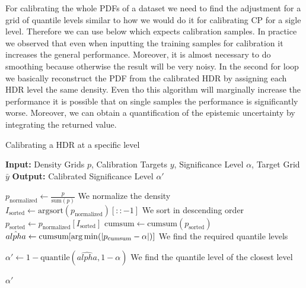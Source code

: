 For calibrating the whole PDFs of a dataset we need to find the adjustment for a grid of quantile levels similar to how we would do it for calibrating CP for a sigle level. Therefore we can use  below which expects calibration samples. In practice we observed that even when inputting the training samples for calibration it increases the general performance. Moreover, it is almost necessary to do smoothing because otherwise the result will be very noisy. In the second for loop we basically reconstruct the PDF from the calibrated HDR by assigning each HDR level the same density. Even tho this algorithm will marginally increase the performance it is possible that on single samples the performance is significantly worse. Moreover, we can obtain a quantification of the epistemic uncertainty by integrating the returned value.

\begin{algorithm}
    \caption{Calibrating a HDR at a specific level}
    \label{alg:calibrate_hdr}
    \begin{algorithmic}
        \STATE \textbf{Input:} Density Grids $p$, Calibration Targets $y$, Significance Level $\alpha$, Target Grid $\bar{y}$
        \STATE \textbf{Output:} Calibrated Significance Level $\alpha'$

        \STATE $p_{\text{normalized}} \leftarrow \frac{p}{\text{sum}(p)}$ We normalize the density
        \STATE $I_{\text{sorted}} \leftarrow \text{argsort}(p_{\text{normalized}})[::-1]$ We sort in descending order
        \STATE $p_{\text{sorted}} \leftarrow p_{\text{normalized}}[I_{\text{sorted}}]$
        \STATE $\text{cumsum} \leftarrow \text{cumsum}(p_{\text{sorted}})$
        \STATE $\hat{alpha} \leftarrow \text{cumsum}[\operatorname*{arg\,min}(|p_{\text{cumsum}} - \alpha|)]$ We find the required quantile levels

        \STATE $\alpha' \leftarrow 1 - \text{quantile}(\hat{alpha}, 1 - \alpha)$ We find the quantile level of the closest level

        \RETURN $\alpha'$

    \end{algorithmic}
\end{algorithm}

